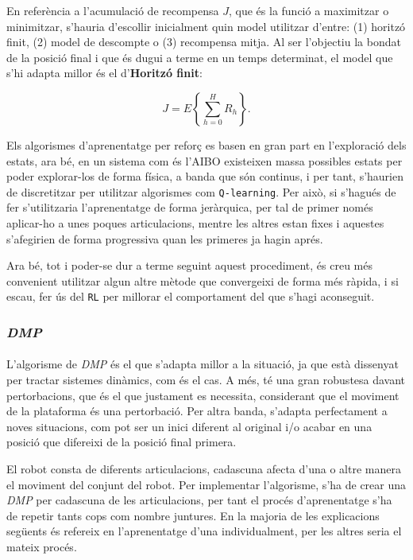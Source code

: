 \documentclass[12pt,a4paper,final,twoside]{article}
\begin{document}
En referència a l'acumulació de recompensa $J$, que és la funció a maximitzar o minimitzar, s'hauria d'escollir inicialment quin model utilitzar d'entre: (1) horitzó finit, (2) model de descompte o (3) recompensa mitja. Al ser l'objectiu la bondat de la posició final i que és dugui a terme en un temps determinat, el model que s'hi adapta millor és el d'\textbf{Horitzó finit}:

\begin{equation}
J=E\left\{ \sum_{h=0}^{H} R_{h} \right\}.
\end{equation}

Els algorismes d'aprenentatge per reforç es basen en gran part en l'exploració dels estats, ara bé, en un sistema com és l'AIBO existeixen massa possibles estats per poder explorar-los de forma física, a banda que són continus, i per tant, s'haurien de discretitzar per utilitzar algorismes com \texttt{Q-learning}. Per això, si s'hagués de fer s'utilitzaria l'aprenentatge de forma jeràrquica, per tal de primer només aplicar-ho a unes poques articulacions, mentre les altres estan fixes i aquestes s'afegirien de forma progressiva quan les primeres ja hagin aprés. 

Ara bé, tot i poder-se dur a terme seguint aquest procediment, és creu més convenient utilitzar algun altre mètode que convergeixi de forma més ràpida, i si escau, fer ús del \texttt{RL} per millorar el comportament del que s'hagi aconseguit.

\subsubsection{\textit{DMP}}
\label{DMP-estudis-preliminars}

\paragraph{}L'algorisme de \textit{DMP} és el que s'adapta millor a la situació, ja que està dissenyat per tractar sistemes dinàmics, com és el cas. A més, té una gran robustesa davant pertorbacions, que és el que justament es necessita, considerant que el moviment de la plataforma és una pertorbació. Per altra banda, s'adapta perfectament a noves situacions, com pot ser un inici diferent al original i/o acabar en una posició que difereixi de la posició final primera.

El robot consta de diferents articulacions, cadascuna afecta d'una o altre manera el moviment del conjunt del robot. Per implementar l'algorisme, s'ha de crear una \textit{DMP} per cadascuna de les articulacions, per tant el procés d'aprenentatge s'ha de repetir tants cops com nombre juntures. En la majoria de les explicacions següents és refereix en l'aprenentatge d'una individualment, per les altres seria el mateix procés.
\end{document}

